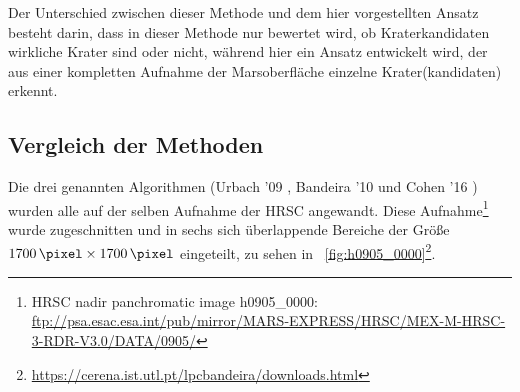 Der Unterschied zwischen dieser Methode und dem hier vorgestellten Ansatz besteht darin, dass in dieser Methode nur bewertet wird, ob Kraterkandidaten wirkliche Krater sind oder nicht, während hier ein Ansatz entwickelt wird, der aus einer kompletten Aufnahme der Marsoberfläche einzelne Krater(kandidaten) erkennt.

\subsection{Vergleich der Methoden}

Die drei genannten Algorithmen (Urbach '09 \cite{urbach_stepinski_2009}, Bandeira '10 \cite{bandeira_10} und Cohen '16 \cite{cohen_16}) wurden alle auf der selben Aufnahme der HRSC angewandt. Diese Aufnahme\footnote{HRSC nadir panchromatic image h0905\_0000: \url{ftp://psa.esac.esa.int/pub/mirror/MARS-EXPRESS/HRSC/MEX-M-HRSC-3-RDR-V3.0/DATA/0905/}} wurde zugeschnitten und in sechs sich überlappende Bereiche der Größe $\SI{1700}{\pixel}\times\SI{1700}{\pixel}$ eingeteilt, zu sehen in \figurename~\ref{fig:h0905_0000}\footnote{\url{https://cerena.ist.utl.pt/lpcbandeira/downloads.html}}.
